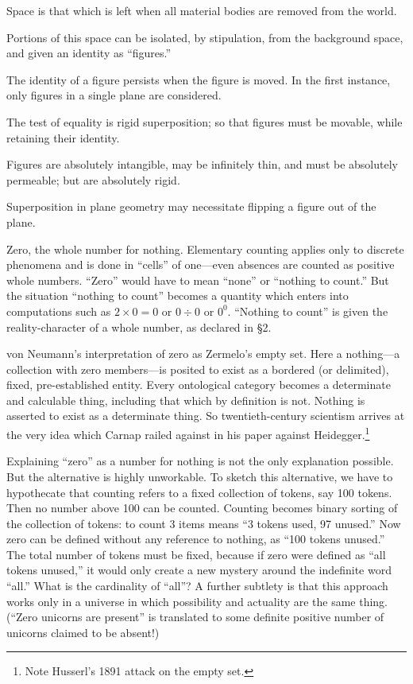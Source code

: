  Space is that which is left when all material bodies are removed from the world.

Portions of this space can be isolated, by stipulation, from the background space, and given an identity as \enquote{figures.}

The identity of a figure persists when the figure is moved. In the first instance, only figures in a single plane are considered.

The test of equality is rigid superposition; so that figures must be movable, while retaining their identity.

Figures are absolutely intangible, may be infinitely thin, and must be absolutely permeable; but are absolutely rigid.

Superposition in plane geometry may necessitate flipping a figure out of the plane.

 Zero, the whole number for nothing. Elementary counting applies only to discrete phenomena and is done in \enquote{cells} of one---even absences are counted as positive whole numbers. \enquote{Zero} would have to mean \enquote{none} or \enquote{nothing to count.} But the situation \enquote{nothing to count} becomes a quantity which enters into computations such as $2\times 0=0$ or $0\div 0$ or $0^0$. \enquote{Nothing to count} is given the reality-character of a whole number, as declared in {\S}2.

von Neumann's interpretation of zero as Zermelo's empty set. Here a nothing---a collection with zero members---is posited to exist as a bordered (or delimited), fixed, pre-established entity. Every ontological category becomes a determinate and calculable thing, including that which by definition is not. Nothing is asserted to exist as a determinate thing. So twentieth-century scientism arrives at the very idea which Carnap railed against in his paper against Heidegger.\footnote{Note Husserl's 1891 attack on the empty set.}

Explaining \enquote{zero} as a number for nothing is not the only explanation possible. But the alternative is highly unworkable. To sketch this alternative, we have to hypothecate that counting refers to a fixed collection of tokens, say 100 tokens. Then no number above 100 can be counted. Counting becomes binary sorting of the collection of tokens: to count 3 items means \enquote{3 tokens used, 97 unused.} Now zero can be defined without any reference to nothing, as \enquote{100 tokens unused.} The total number of tokens must be fixed, because if zero were defined as \enquote{all tokens unused,} it would only create a new mystery around the indefinite word \enquote{all.} What is the cardinality of \enquote{all}? A further subtlety is that this approach works only in a universe in which possibility and actuality are the same thing. (\enquote{Zero unicorns are present} is translated to some definite positive number of unicorns claimed to be absent!)


